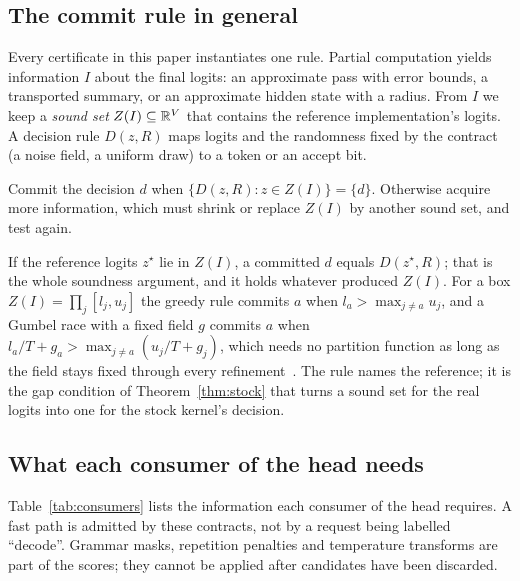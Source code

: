 \subsection{The commit rule in general}\label{app:commit}\label{sec:commit}
Every certificate in this paper instantiates one rule. Partial computation yields information $I$ about the final logits: an approximate pass with error bounds, a transported summary, or an approximate hidden state with a radius. From $I$ we keep a \emph{sound set} $Z(I)\subseteq\mathbb R^V$ that contains the reference implementation's logits. A decision rule $D(z,R)$ maps logits and the randomness fixed by the contract (a noise field, a uniform draw) to a token or an accept bit.
\begin{definition}\label{def:commit}
Commit the decision $d$ when $\{D(z,R):z\in Z(I)\}=\{d\}$. Otherwise acquire more information, which must shrink or replace $Z(I)$ by another sound set, and test again.
\end{definition}
If the reference logits $z^\star$ lie in $Z(I)$, a committed $d$ equals $D(z^\star,R)$; that is the whole soundness argument, and it holds whatever produced $Z(I)$. For a box $Z(I)=\prod_j[l_j,u_j]$ the greedy rule commits $a$ when $l_a>\max_{j\neq a}u_j$, and a Gumbel race with a fixed field $g$ commits $a$ when $l_a/T+g_a>\max_{j\ne a}(u_j/T+g_j)$, which needs no partition function as long as the field stays fixed through every refinement~\cite{astar}. The rule names the reference; it is the gap condition of Theorem~\ref{thm:stock} that turns a sound set for the real logits into one for the stock kernel's decision.

\subsection{What each consumer of the head needs}\label{app:consumers}\label{sec:consumers}
Table~\ref{tab:consumers} lists the information each consumer of the head requires. A fast path is admitted by these contracts, not by a request being labelled ``decode''. Grammar masks, repetition penalties and temperature transforms are part of the scores; they cannot be applied after candidates have been discarded.

